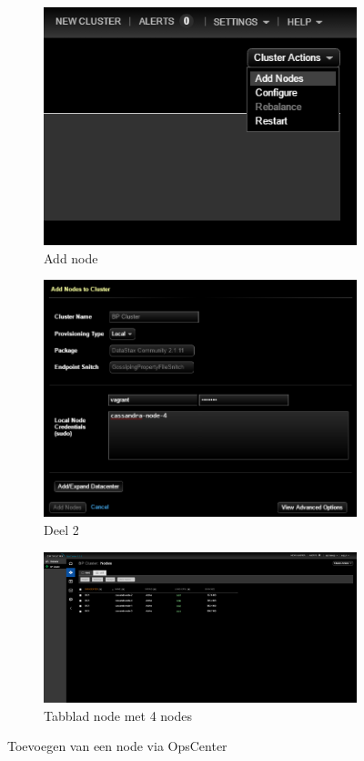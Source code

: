\begin{figure}[H]
	\centering
	\begin{subfigure}{.49\textwidth}
		\centering
		\includegraphics[width=.9\linewidth]{img/4_installatie_cassandra/4_Add_Node_1}
		\caption{Add node}
		\label{fig:cas_add_node_1}
	\end{subfigure}
	\begin{subfigure}{.49\textwidth}
		\centering
		\includegraphics[width=.9\linewidth]{img/4_installatie_cassandra/4_Add_Node_2}
		\caption{Deel 2}
		\label{fig:cas_add_node_2}
	\end{subfigure}
	\begin{subfigure}{\textwidth}
		\centering
		\includegraphics[width=.9\linewidth]{img/4_installatie_cassandra/4_Add_Node_7a}
		\caption{Tabblad node met 4 nodes}
		\label{fig:cas_add_node_3}
	\end{subfigure}
	\caption{Toevoegen van een node via OpsCenter}
	\label{fig:cas_add_node}
\end{figure}
